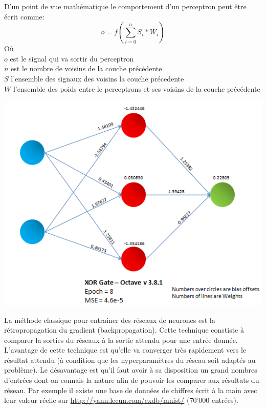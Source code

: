 \documentclass{article}
\begin{document}
D'un point de vue mathématique le comportement d'un perceptron peut être écrit comme:
\begin{equation}
o = f(\sum_{i=0}^{n} S_i * W_i)
\end{equation}
Où\\
$o$ est le signal qui va sortir du perceptron\\
$n$ est le nombre de voisins de la couche précédente\\
$S$ l'ensemble des signaux des voisins la couche précedente\\
$W$ l'ensemble des poids entre le perceptrons et ses voisins de la couche précédente

\begin{center}
\includegraphics[scale=0.5]{XOR_Gate.png}
\end{center}

La méthode classique pour entrainer des réseaux de neurones est la rétropropagation du gradient (backpropagation). Cette technique constiste à comparer la sorties du réseaux à la sortie attendu pour une entrée donnée. L'avantage de cette technique est qu'elle va converger très rapidement vers le résultat attendu (à condition que les hyperparamètres du réseau soit adaptés au problème). Le désavantage est qu'il faut avoir à sa disposition un grand nombres d'entrées dont on connais la nature afin de pouvoir les comparer aux résultats du réseau. Par exemple il existe une base de données de chiffres écrit à la main avec leur valeur réelle sur \url{http://yann.lecun.com/exdb/mnist/} (70'000 entrées).\\
\end{document}
